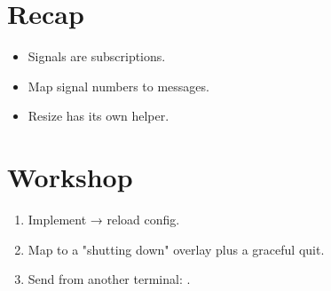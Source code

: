 \section{Recap}

\begin{recap}
\begin{itemize}[leftmargin=*]
  \item Signals are subscriptions.
  \item Map signal numbers to messages.
  \item Resize has its own helper.
\end{itemize}
\end{recap}

\section*{Workshop}

\begin{enumerate}[leftmargin=*]
  \item Implement  → reload config.
  \item Map  to a "shutting down" overlay
    plus a graceful quit.
  \item Send  from another terminal:
    .
\end{enumerate}
